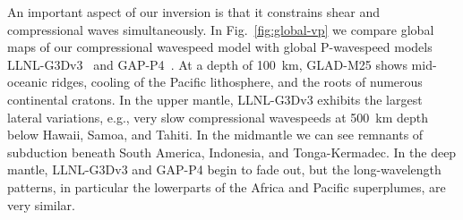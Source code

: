 \documentclass[extra,mreferee]{gji}
\begin{document}

An important aspect of our inversion is that it constrains shear and
compressional waves simultaneously. In Fig.~\ref{fig:global-vp} we
compare global maps of our compressional wavespeed model with global P-wavespeed models
LLNL-G3Dv3~\citep{simmons2012llnl} and GAP-P4~\citep{fukao2013subducted}.
At a depth of 100~km,
GLAD-M25 shows mid-oceanic ridges, cooling of the Pacific lithosphere,
and the roots of numerous continental cratons. In the upper mantle, LLNL-G3Dv3
exhibits the largest lateral variations,
e.g., very slow compressional wavespeeds at 500~km depth below Hawaii, Samoa, and Tahiti.
In the midmantle we can see remnants of subduction beneath South America, Indonesia,
and Tonga-Kermadec.
In the deep mantle, LLNL-G3Dv3 and GAP-P4 begin to fade out, but the long-wavelength patterns,
in particular the lowerparts of the Africa and Pacific superplumes, are very similar.
\end{document}
